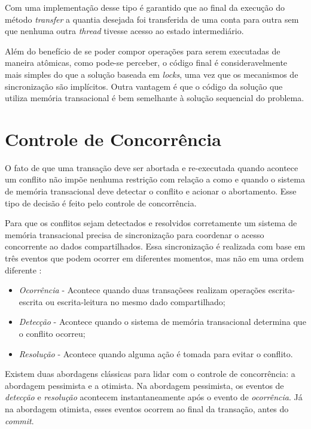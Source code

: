 Com uma implementação desse tipo é garantido que ao final da execução do método \emph{transfer} a quantia desejada foi transferida de uma conta para outra sem que nenhuma outra \emph{thread} tivesse acesso ao estado intermediário.

Além do benefício de se poder compor operações para serem executadas de maneira atômicas, como pode-se perceber, o código final é consideravelmente mais simples do que a solução baseada em \emph{locks}, uma vez que os mecanismos de sincronização são implícitos. Outra vantagem é que o código da solução que utiliza memória transacional é bem semelhante à solução sequencial do problema.


\section{Controle de Concorrência}

O fato de que uma transação deve ser abortada e re-executada quando acontece um conflito não impõe nenhuma restrição com relação a como e quando o sistema de memória transacional deve detectar o conflito e acionar o abortamento. Esse tipo de decisão é feito pelo controle de concorrência.

Para que os conflitos sejam detectados e resolvidos corretamente um sistema de memória transacional precisa de sincronização para coordenar o acesso concorrente ao dados compartilhados. Essa sincronização é realizada com base em três eventos que podem ocorrer em diferentes momentos, mas não em uma ordem diferente \cite{harris2010transactional}:

\begin{itemize}
 \item \emph{Ocorrência} - Acontece quando duas transaçõees realizam operações escrita-escrita ou escrita-leitura no mesmo dado compartilhado;
 \item \emph{Detecção} - Acontece quando o sistema de memória transacional determina que o conflito ocorreu;
 \item \emph{Resolução} - Acontece quando alguma ação é tomada para evitar o conflito.
\end{itemize}

Existem duas abordagens clássicas para lidar com o controle de concorrência: a abordagem pessimista e a otimista. Na abordagem pessimista, os eventos de \emph{detecção} e \emph{resolução} acontecem instantaneamente após o evento de \emph{ocorrência}. Já na abordagem otimista, esses eventos ocorrem ao final da transação, antes do \emph{commit}.

